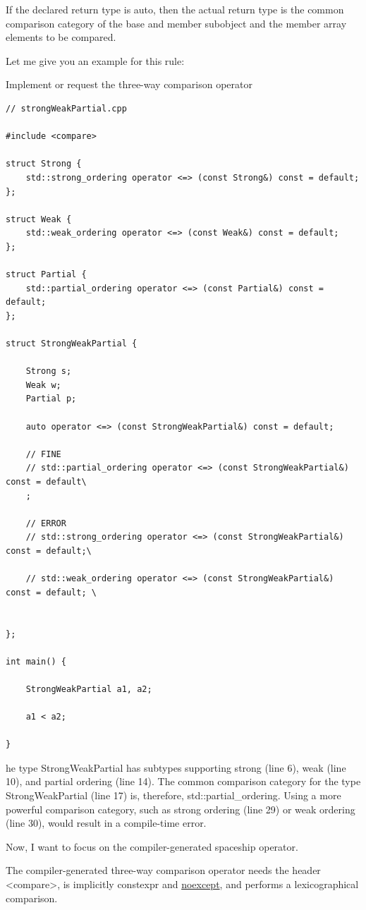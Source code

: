 If the declared return type is auto, then the actual return type is the common comparison category of the base and member subobject and the member array elements to be compared.

Let me give you an example for this rule:

\noindent
Implement or request the three-way comparison operator
\begin{lstlisting}[style=styleCXX]
// strongWeakPartial.cpp

#include <compare>

struct Strong {
	std::strong_ordering operator <=> (const Strong&) const = default;
};

struct Weak {
	std::weak_ordering operator <=> (const Weak&) const = default;
};

struct Partial {
	std::partial_ordering operator <=> (const Partial&) const = default;
};

struct StrongWeakPartial {

	Strong s;
	Weak w;
	Partial p;
	
	auto operator <=> (const StrongWeakPartial&) const = default;
	
	// FINE
	// std::partial_ordering operator <=> (const StrongWeakPartial&) const = default\
	;
	
	// ERROR
	// std::strong_ordering operator <=> (const StrongWeakPartial&) const = default;\
	
	// std::weak_ordering operator <=> (const StrongWeakPartial&) const = default; \


};

int main() {

	StrongWeakPartial a1, a2;
	
	a1 < a2;

}
\end{lstlisting}

he type StrongWeakPartial has subtypes supporting strong (line 6), weak (line 10), and partial ordering (line 14). The common comparison category for the type StrongWeakPartial (line 17) is, therefore, std::partial\_ordering. Using a more powerful comparison category, such as strong ordering (line 29) or weak ordering (line 30), would result in a compile-time error.

Now, I want to focus on the compiler-generated spaceship operator.


The compiler-generated three-way comparison operator needs the header <compare>, is implicitly constexpr and \href{https://www.modernescpp.com/index.php/c-core-guidelines-the-noexcept-specifier-and-operator}{noexcept}, and performs a lexicographical comparison.

